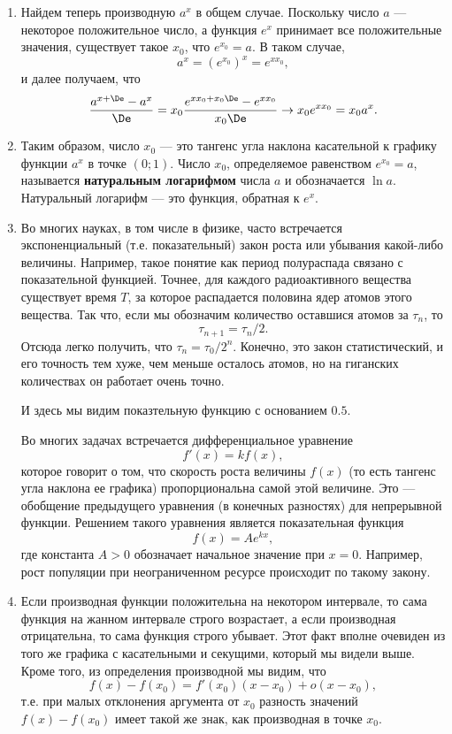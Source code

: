 \begin{enumerate}
\item Найдем теперь производную $a^x$ в общем случае. Поскольку число $a$ --- некоторое положительное число, а функция $e^x$ принимает все положительные значения, существует такое $x_0$, что $e^{x_0}=a$. В таком случае,
$$
a^x = (e^{x_0})^x = e^{xx_0},
$$
и далее получаем, что
$$
\frac{a^{x+\De}-a^x}{\De} = x_0\frac{e^{xx_0+x_0\De}-e^{xx_0}}{x_0\De} \to x_0 e^{xx_0} = x_0a^x.
$$
\item Таким образом, число $x_0$ --- это тангенс угла наклона касательной к графику функции $a^x$ в точке $(0;1)$. Число $x_0$, определяемое равенством $e^{x_0}=a$, называется \textbf{натуральным логарифмом} числа $a$ и обозначается $\ln a$. Натуральный логарифм --- это функция, обратная к $e^x$.
\item Во многих науках, в том числе в физике, часто встречается экспоненциальный (т.е. показательный) закон роста или убывания какой-либо величины. Например, такое понятие как период полураспада связано с показательной функцией. Точнее, для каждого радиоактивного вещества существует время $T$, за которое распадается половина ядер атомов этого вещества. Так что, если мы обозначим количество оставшися атомов за $\tau_n$, то
$$
\tau_{n+1}=\tau_n/2.
$$
Отсюда легко получить, что $\tau_n=\tau_0/2^n$. Конечно, это закон статистический, и его точность тем хуже, чем меньше осталось атомов, но на гиганских количествах он работает очень точно.

И здесь мы видим показтельную функцию с основанием $0.5$.

Во многих задачах встречается дифференциальное уравнение
$$
f'(x)=kf(x),
$$
которое говорит о том, что скорость роста величины $f(x)$ (то есть тангенс угла наклона ее графика) пропорциональна самой этой величине. Это --- обобщение предыдущего уравнения (в конечных разностях) для непрерывной функции. Решением такого уравнения является показательная функция
$$
f(x) = Ae^{kx},
$$
где константа $A>0$ обозначает начальное значение при $x=0$.
Например, рост популяции при неограниченном ресурсе происходит по такому закону.

\item Если производная функции положительна на некотором интервале, то сама функция на жанном интервале строго возрастает, а если производная отрицательна, то сама функция строго убывает. Этот факт вполне очевиден из того же графика с касательными и секущими, который мы видели выше. Кроме того, из определения производной мы видим, что
$$
f(x)-f(x_0)=f'(x_0)(x-x_0)+o(x-x_0),
$$
т.е. при малых отклонения аргумента от $x_0$ разность значений $f(x)-f(x_0)$ имеет такой же знак, как производная в точке $x_0$.


\end{enumerate}
